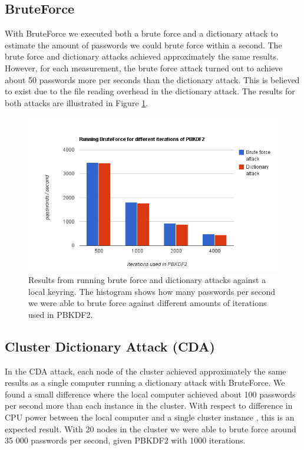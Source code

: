 \documentclass[pdftex,english,10pt,b5paper,twoside]{book}
\begin{document}
\subsection{BruteForce}
With BruteForce we executed both a brute force and a dictionary attack to estimate the
amount of passwords we could brute force within a second. The brute force
and dictionary attacks achieved approximately the same results. However, for
each measurement, the brute force attack turned out to achieve about 50
passwords more per seconds than the dictionary attack. This is believed to
exist due to the file reading overhead in the dictionary attack. The results for both
attacks are illustrated in Figure \ref{fig:bfres}.

\begin{figure}[!h]
\centering
\includegraphics[scale=0.55]{bf.png}
\caption{Results from running brute force and dictionary attacks against a local
keyring. The histogram shows how many passwords per second we were able to brute
force against different amounts of iterations used in PBKDF2.}
\label{fig:bfres}
\end{figure}
\subsection{Cluster Dictionary Attack (CDA)}
In the CDA attack, each node of the cluster achieved approximately the same results as a single computer
running a dictionary attack with BruteForce. We found a small difference where
the local computer achieved about 100 passwords per second more than each
instance in the cluster. With respect to difference in CPU power between the
local computer and a single cluster instance \cite{cpubench}, this is an expected
result. With 20 nodes in the cluster we were able to brute force around 35 000
passwords per second, given PBKDF2 with 1000 iterations.
\end{document}
